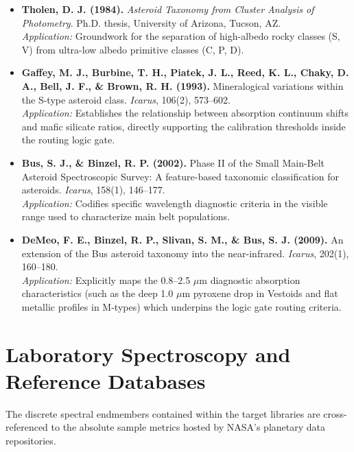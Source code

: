 \documentclass[11pt,letterpaper]{article}
\begin{document}
\begin{itemize}
    \item \textbf{Tholen, D. J. (1984).} \textit{Asteroid Taxonomy from Cluster Analysis of Photometry}. Ph.D. thesis, University of Arizona, Tucson, AZ. \\
    \textit{Application:} Groundwork for the separation of high-albedo rocky classes (S, V) from ultra-low albedo primitive classes (C, P, D).
    
    \item \textbf{Gaffey, M. J., Burbine, T. H., Piatek, J. L., Reed, K. L., Chaky, D. A., Bell, J. F., \& Brown, R. H. (1993).} Mineralogical variations within the S-type asteroid class. \textit{Icarus}, 106(2), 573--602. \\
    \textit{Application:} Establishes the relationship between absorption continuum shifts and mafic silicate ratios, directly supporting the calibration thresholds inside the routing logic gate.
    
    \item \textbf{Bus, S. J., \& Binzel, R. P. (2002).} Phase II of the Small Main-Belt Asteroid Spectroscopic Survey: A feature-based taxonomic classification for asteroids. \textit{Icarus}, 158(1), 146--177. \\
    \textit{Application:} Codifies specific wavelength diagnostic criteria in the visible range used to characterize main belt populations.
    
    \item \textbf{DeMeo, F. E., Binzel, R. P., Slivan, S. M., \& Bus, S. J. (2009).} An extension of the Bus asteroid taxonomy into the near-infrared. \textit{Icarus}, 202(1), 160--180. \\
    \textit{Application:} Explicitly maps the 0.8--2.5 $\mu$m diagnostic absorption characteristics (such as the deep 1.0 $\mu$m pyroxene drop in Vestoids and flat metallic profiles in M-types) which underpins the logic gate routing criteria.
\end{itemize}

\section{Laboratory Spectroscopy and Reference Databases}
The discrete spectral endmembers contained within the target libraries are cross-referenced to the absolute sample metrics hosted by NASA's planetary data repositories.
\end{document}
